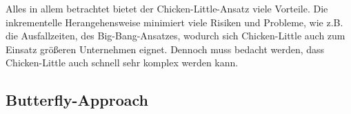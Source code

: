 \lb
Alles in allem betrachtet bietet der Chicken-Little-Ansatz viele Vorteile. Die inkrementelle Herangehensweise minimiert viele Risiken und Probleme, wie z.B. die Ausfallzeiten, des Big-Bang-Ansatzes, wodurch sich Chicken-Little auch zum Einsatz größeren Unternehmen eignet. Dennoch muss bedacht werden, dass Chicken-Little auch schnell sehr komplex werden kann.

\subsection{Butterfly-Approach}



